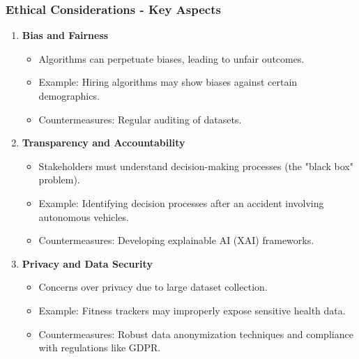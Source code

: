 \documentclass{beamer}
\begin{document}
\begin{frame}[fragile]
    \frametitle{Ethical Considerations - Key Aspects}
    \begin{enumerate}
        \item \textbf{Bias and Fairness}
        \begin{itemize}
            \item Algorithms can perpetuate biases, leading to unfair outcomes.
            \item Example: Hiring algorithms may show biases against certain demographics.
            \item Countermeasures: Regular auditing of datasets.
        \end{itemize}
        
        \item \textbf{Transparency and Accountability}
        \begin{itemize}
            \item Stakeholders must understand decision-making processes (the "black box" problem).
            \item Example: Identifying decision processes after an accident involving autonomous vehicles.
            \item Countermeasures: Developing explainable AI (XAI) frameworks.
        \end{itemize}

        \item \textbf{Privacy and Data Security}
        \begin{itemize}
            \item Concerns over privacy due to large dataset collection.
            \item Example: Fitness trackers may improperly expose sensitive health data.
            \item Countermeasures: Robust data anonymization techniques and compliance with regulations like GDPR.
        \end{itemize}
    \end{enumerate}
\end{frame}
\end{document}
